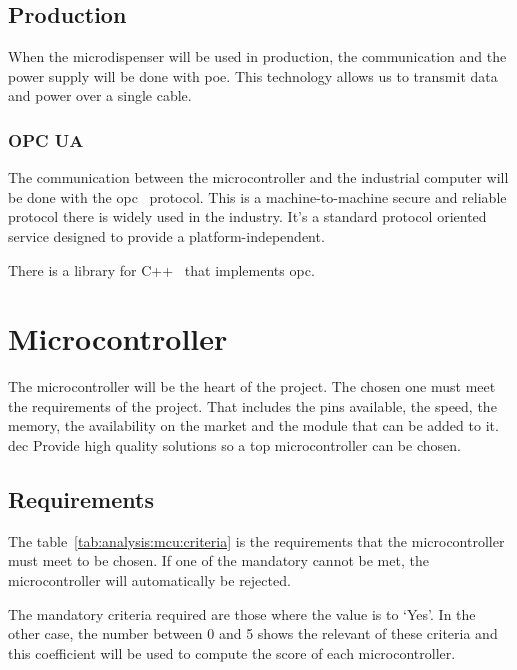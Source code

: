 \subsection{Production}
\label{subsec:ethernet}
When the microdispenser will be used in production, the communication and the power supply will be done with \acrfull{poe}.
This technology allows us to transmit data and power over a single cable.

\subsubsection{OPC UA}
\label{subsubsec:opc}
The communication between the microcontroller and the industrial computer will be done with the \acrfull{opc}~\cite{opc} protocol.
This is a machine-to-machine secure and reliable protocol there is widely used in the industry.
It's a standard protocol oriented service designed to provide a platform-independent.

There is a library for C++~\cite{open62541_2023} that implements \acrshort{opc}.

\section{Microcontroller}
\label{sec:mcu}
The microcontroller will be the heart of the project.
The chosen one must meet the requirements of the project.
That includes the pins available, the speed, the memory, the availability on the market and the module that can be added to it.
\acrshort{dec} Provide high quality solutions so a top microcontroller can be chosen.

\newpage
\subsection{Requirements}
\label{subsec:requirements}
The table~\ref{tab:analysis:mcu:criteria} is the requirements that the microcontroller must meet to be chosen.
If one of the mandatory cannot be met, the microcontroller will automatically be rejected.

The mandatory criteria required are those where the value is to `Yes'.
In the other case, the number between 0 and 5 shows the relevant of these criteria and this coefficient will be used to compute the score of each microcontroller.


